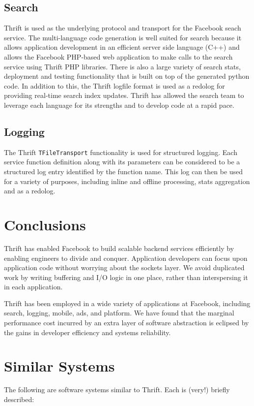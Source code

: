 \documentclass[nocopyrightspace,blockstyle]{sigplanconf}
\begin{document}
\subsection{Search}
Thrift is used as the underlying protocol and transport for the Facebook seach service.
The multi-language code generation is well suited for search because it allows application
development in an efficient server side language (C++) and allows the Facebook PHP-based web application
to make calls to the search service using Thrift PHP libraries. There is also a large
variety of search stats, deployment and testing functionality that is built on top 
of the generated python code. In addition to this, the Thrift logfile format is
used as a redolog for providing real-time search index updates. Thrift has allowed the 
search team to leverage each language for its strengths and to develop code at a rapid pace. 

\subsection{Logging}
The Thrift \texttt{TFileTransport} functionality is used for structured logging. Each
service function definition along with its parameters can be considered to be
a structured log entry identified by the function name. This log can then be used for 
a variety of purposes, including inline and offline processing, stats aggregation and as a redolog.

\section{Conclusions}
Thrift has enabled Facebook to build scalable backend
services efficiently by enabling engineers to divide and conquer. Application
developers can focus upon application code without worrying about the
sockets layer. We avoid duplicated work by writing buffering and I/O logic
in one place, rather than interspersing it in each application.

Thrift has been employed in a wide variety of applications at Facebook,
including search, logging, mobile, ads, and platform. We have
found that the marginal performance cost incurred by an extra layer of
software abstraction is eclipsed by the gains in developer efficiency and
systems reliability.

\appendix

\section{Similar Systems}
The following are software systems similar to Thrift. Each is (very!) briefly
described:
\end{document}
